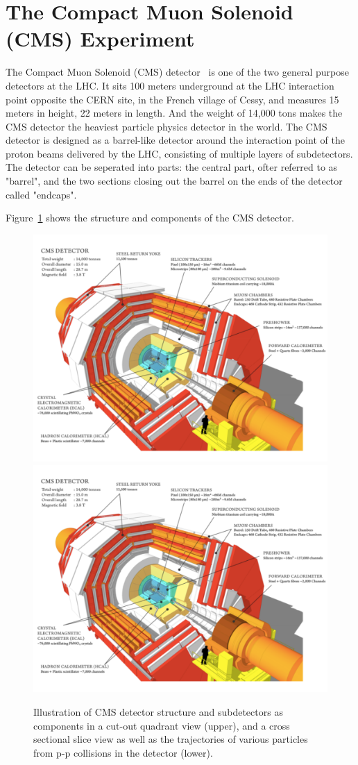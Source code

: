 \section{The Compact Muon Solenoid (CMS) Experiment}
The Compact Muon Solenoid (CMS) detector~\cite{lhc_cmsatcern} is one of the two general purpose detectors at the LHC. It sits 100 meters underground at the LHC interaction point opposite the CERN site, in the French village of Cessy, and measures 15 meters in height, 22 meters in length. And the weight of 14,000 tons makes the CMS detector the heaviest particle physics detector in the world. The CMS detector is designed as a barrel-like detector around the interaction point of the proton beams delivered by the LHC, consisting of multiple layers of subdetectors. The detector can be seperated into parts: the central part, ofter referred to as "barrel", and the two sections closing out the barrel on the ends of the detector called "endcaps". 

Figure~\ref{fig:lhc_cmsstructure} shows the structure and components of the CMS detector.
\begin{figure}[htbp]
\begin{center}
\includegraphics[width=0.7\linewidth, page=1]{figures/lhc_cmsstructure.pdf}
\includegraphics[width=0.7\linewidth, page=2]{figures/lhc_cmsstructure.pdf}
\caption{Illustration of CMS detector structure and subdetectors as components in a cut-out quadrant view (upper), and a cross sectional slice view as well as the trajectories of various particles from p-p collisions in the detector (lower).}
\label{fig:lhc_cmsstructure}
\end{center}
\end{figure}

